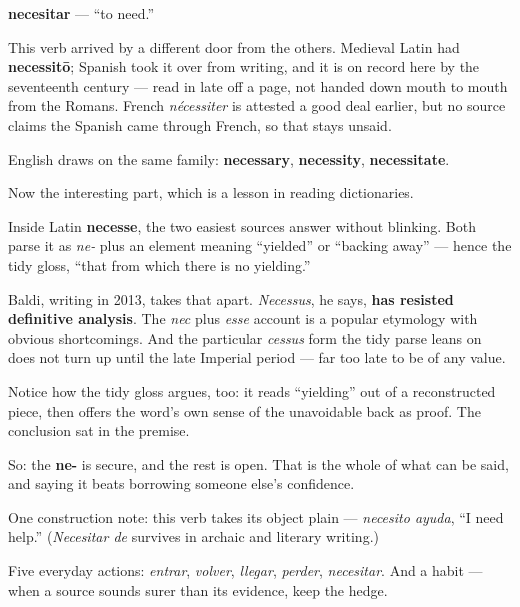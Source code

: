 \begin{cousinweb}
\textbf{necesitar} — \textquotedblleft{}to need.\textquotedblright{}

This verb arrived by a different door from the others. Medieval Latin had \textbf{necessitō}; Spanish took it over from writing, and it is on record here by the seventeenth century — read in late off a page, not handed down mouth to mouth from the Romans. French \emph{nécessiter} is attested a good deal earlier, but no source claims the Spanish came through French, so that stays unsaid.

English draws on the same family: \textbf{necessary}, \textbf{necessity}, \textbf{necessitate}.

Now the interesting part, which is a lesson in reading dictionaries.

Inside Latin \textbf{necesse}, the two easiest sources answer without blinking. Both parse it as \emph{ne-} plus an element meaning \textquotedblleft{}yielded\textquotedblright{} or \textquotedblleft{}backing away\textquotedblright{} — hence the tidy gloss, \textquotedblleft{}that from which there is no yielding.\textquotedblright{}

Baldi, writing in 2013, takes that apart. \emph{Necessus}, he says, \textbf{has resisted definitive analysis}. The \emph{nec} plus \emph{esse} account is a popular etymology with obvious shortcomings. And the particular \emph{cessus} form the tidy parse leans on does not turn up until the late Imperial period — far too late to be of any value.

Notice how the tidy gloss argues, too: it reads \textquotedblleft{}yielding\textquotedblright{} out of a reconstructed piece, then offers the word's own sense of the unavoidable back as proof. The conclusion sat in the premise.

So: the \textbf{ne-} is secure, and the rest is open. That is the whole of what can be said, and saying it beats borrowing someone else's confidence.

One construction note: this verb takes its object plain — \emph{necesito ayuda}, \textquotedblleft{}I need help.\textquotedblright{} (\emph{Necesitar de} survives in archaic and literary writing.)
\end{cousinweb}

\begin{grammarlens}[title={What you've built}]
Five everyday actions: \emph{entrar}, \emph{volver}, \emph{llegar}, \emph{perder}, \emph{necesitar}. And a habit — when a source sounds surer than its evidence, keep the hedge.
\end{grammarlens}

